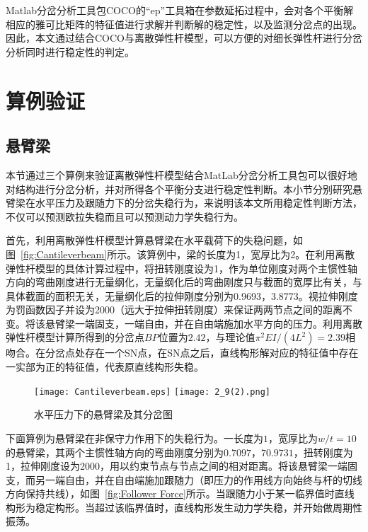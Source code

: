 Matlab分岔分析工具包COCO的“ep”工具箱在参数延拓过程中，会对各个平衡解相应的雅可比矩阵的特征值进行求解并判断解的稳定性，以及监测分岔点的出现。因此，本文通过结合COCO与离散弹性杆模型，可以方便的对细长弹性杆进行分岔分析同时进行稳定性的判定。
\section{算例验证}
\subsection{悬臂梁}
本节通过三个算例来验证离散弹性杆模型结合MatLab分岔分析工具包可以很好地对结构进行分岔分析，并对所得各个平衡分支进行稳定性判断。本小节分别研究悬臂梁在水平压力及跟随力下的分岔失稳行为，来说明该本文所用稳定性判断方法，不仅可以预测欧拉失稳而且可以预测动力学失稳行为。

首先，利用离散弹性杆模型计算悬臂梁在水平载荷下的失稳问题，如图~\ref{fig:Cantileverbeam}所示。该算例中，梁的长度为1，宽厚比为2。在利用离散弹性杆模型的具体计算过程中，将扭转刚度设为1，作为单位刚度对两个主惯性轴方向的弯曲刚度进行无量纲化，无量纲化后的弯曲刚度只与截面的宽厚比有关，与具体截面的面积无关，无量纲化后的拉伸刚度分别为0.9693，3.8773。视拉伸刚度为罚函数因子并设为2000（远大于拉伸扭转刚度）来保证两两节点之间的距离不变。将该悬臂梁一端固支，一端自由，并在自由端施加水平方向的压力。利用离散弹性杆模型计算所得到的分岔点$BP$位置为$2.42$，与理论值$\pi^2EI/(4L^2)=2.39$相吻合。在分岔点处存在一个SN点，在SN点之后，直线构形解对应的特征值中存在一实部为正的特征值，代表原直线构形失稳。

\begin{figure}
	\centering
	{\texttt{[image: Cantileverbeam.eps]}}
	{\texttt{[image: 2\_9(2).png]}}\\
	\caption{水平压力下的悬臂梁及其分岔图}
	\label{fig:水平压力下悬臂梁的失稳行为}
\end{figure}

下面算例为悬臂梁在非保守力作用下的失稳行为。一长度为$1$，宽厚比为$w/t=10$的悬臂梁，其两个主惯性轴方向的弯曲刚度分别为$0.7097$，$70.9731$，扭转刚度为1，拉伸刚度设为2000，用以约束节点与节点之间的相对距离。将该悬臂梁一端固支，而另一端自由，并在自由端施加跟随力（即压力的作用线方向始终与杆的切线方向保持共线），如图~\ref{fig:Follower Force}所示。当跟随力小于某一临界值时直线构形为稳定构形。当超过该临界值时，直线构形发生动力学失稳，并开始做周期性振荡。

